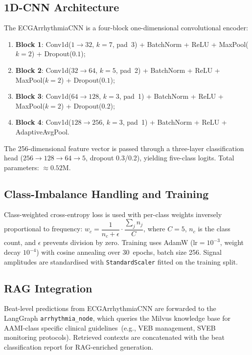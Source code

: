 \documentclass[journal,10pt,twoside]{IEEEtran}
\begin{document}
\subsection{1D-CNN Architecture}

The ECGArrhythmiaCNN is a four-block one-dimensional convolutional encoder:
\begin{enumerate}
  \item \textbf{Block 1}: Conv1d($1{\to}32$, $k{=}7$, pad~3) + BatchNorm + ReLU +
        MaxPool($k{=}2$) + Dropout($0.1$);
  \item \textbf{Block 2}: Conv1d($32{\to}64$, $k{=}5$, pad~2) + BatchNorm + ReLU +
        MaxPool($k{=}2$) + Dropout($0.1$);
  \item \textbf{Block 3}: Conv1d($64{\to}128$, $k{=}3$, pad~1) + BatchNorm + ReLU +
        MaxPool($k{=}2$) + Dropout($0.2$);
  \item \textbf{Block 4}: Conv1d($128{\to}256$, $k{=}3$, pad~1) + BatchNorm + ReLU +
        AdaptiveAvgPool.
\end{enumerate}
The 256-dimensional feature vector is passed through a three-layer classification
head ($256{\to}128{\to}64{\to}5$, dropout 0.3/0.2), yielding five-class logits.
Total parameters: $\approx\!0.52\text{M}$.

\subsection{Class-Imbalance Handling and Training}

Class-weighted cross-entropy loss is used with per-class weights inversely
proportional to frequency:
$w_c = \dfrac{1}{n_c + \epsilon} \cdot \dfrac{\sum_j n_j}{C}$,
where $C{=}5$, $n_c$ is the class count, and $\epsilon$ prevents division by zero.
Training uses AdamW ($\text{lr}{=}10^{-3}$, weight decay $10^{-4}$) with cosine
annealing over 30~epochs, batch size 256.
Signal amplitudes are standardised with \texttt{StandardScaler} fitted on the
training split.

\subsection{RAG Integration}

Beat-level predictions from ECGArrhythmiaCNN are forwarded to the LangGraph
\texttt{arrhythmia\_node}, which queries the Milvus knowledge base for AAMI-class
specific clinical guidelines~(e.g., VEB management, SVEB monitoring protocols).
Retrieved contexts are concatenated with the beat classification report for
RAG-enriched generation.
\end{document}
